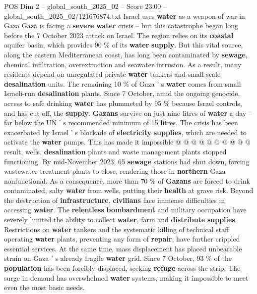 \begin{textsample}{POS Dim 2 – global\_south\_2025\_02 – Score 23.00 – global\_south\_2025\_02/121676874.txt}  \label{ex:f2_pos_421}
Israel uses \textbf{water} as a weapon of war in Gaza Gaza is facing a \textbf{severe} \textbf{water} crisis -- but this catastrophe began long before the 7 October 2023 attack on Israel.
The region relies on its \textbf{coastal} aquifer basin, which provides 90 \% of its \textbf{water} \textbf{supply}.
But this vital source, along the eastern Mediterranean coast, has long been contaminated by \textbf{sewage}, chemical infiltration, overextraction and seawater intrusion.
As a result, many residents depend on unregulated private \textbf{water} tankers and small-scale \textbf{desalination} units.
The remaining 10 \% of Gaza ' s \textbf{water} comes from small Israeli-run \textbf{desalination} plants.
Since 7 October, amid the ongoing genocide, access to safe drinking \textbf{water} has plummeted by 95 \% because Israel controls, and has cut off, the \textbf{supply}. \textbf{Gazans} survive on just nine litres of \textbf{water} a day -- far below the UN ' s recommended minimum of 15 litres.
The crisis has been exacerbated by Israel ' s blockade of \textbf{electricity} \textbf{supplies}, which are needed to activate the \textbf{water} pumps.
This has made it impossible @ @ @ @ @ @ @ @ @ @ result, wells, \textbf{desalination} plants and waste management plants stopped functioning.
By mid-November 2023, 65 \textbf{sewage} stations had shut down, forcing wastewater treatment plants to close, rendering those in \textbf{northern} Gaza nonfunctional.
As a consequence, more than 70 \% of \textbf{Gazans} are forced to drink contaminated, salty \textbf{water} from wells, putting their \textbf{health} at grave risk.
Beyond the destruction of \textbf{infrastructure}, \textbf{civilians} face immense difficulties in accessing \textbf{water}.
The \textbf{relentless} \textbf{bombardment} and military occupation have severely limited the ability to collect \textbf{water}, farm and \textbf{distribute} \textbf{supplies}.
Restrictions on \textbf{water} tankers and the systematic killing of technical staff operating \textbf{water} plants, preventing any form of \textbf{repair}, have further crippled essential services.
At the same time, mass displacement has placed unbearable strain on Gaza ' s already fragile \textbf{water} grid.
Since 7 October, 93 \% of the \textbf{population} has been forcibly displaced, seeking \textbf{refuge} across the strip.
The surge in demand has overwhelmed \textbf{water} systems, making it impossible to meet even the most basic needs.

\end{textsample}
